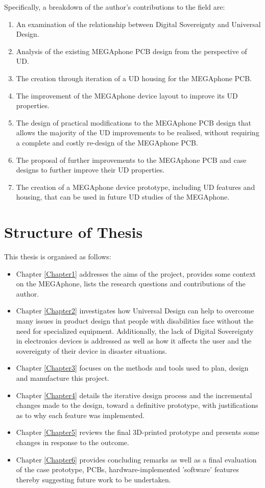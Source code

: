 Specifically, a breakdown of the author's contributions to the field are:
\begin{enumerate}
    \item An examination of the relationship between Digital Sovereignty and Universal Design.
    \item Analysis of the existing MEGAphone PCB design from the perspective of UD.
    \item The creation through iteration of a UD housing for the MEGAphone PCB.
    \item The improvement of the MEGAphone device layout to improve its UD properties.
    \item The design of practical modifications to the MEGAphone PCB design that allows the majority of the UD improvements to be realised, without requiring a complete and costly re-design of the MEGAphone PCB.
    \item The proposal of further improvements to the MEGAphone PCB and case designs to further improve their UD properties.
    \item The creation of a MEGAphone device prototype, including UD features and housing, that can be used in future UD studies of the MEGAphone.
\end{enumerate}

\section{Structure of Thesis}

This thesis is organised as follows:
\begin{itemize}
    \item Chapter \ref{Chapter1} addresses the aims of the project, provides some context on the MEGAphone, lists the research questions and contributions of the author.
    \item Chapter \ref{Chapter2} investigates how Universal Design can help to overcome many issues in product design that people with disabilities face without the need for specialized equipment. Additionally, the lack of Digital Sovereignty in electronics devices is addressed as well as how it affects the user and the sovereignty of their device in disaster situations.
    \item Chapter \ref{Chapter3} focuses on the methods and tools used to plan, design and manufacture this project.
    \item Chapter \ref{Chapter4} details the iterative design process and the incremental changes made to the design, toward a definitive prototype, with justifications as to why each feature was implemented.
    \item Chapter \ref{Chapter5} reviews the final 3D-printed prototype and presents some changes in response to the outcome.
    \item Chapter \ref{Chapter6} provides concluding remarks as well as a final evaluation of the case prototype, PCBs, hardware-implemented 'software' features thereby suggesting future work to be undertaken.
\end{itemize}